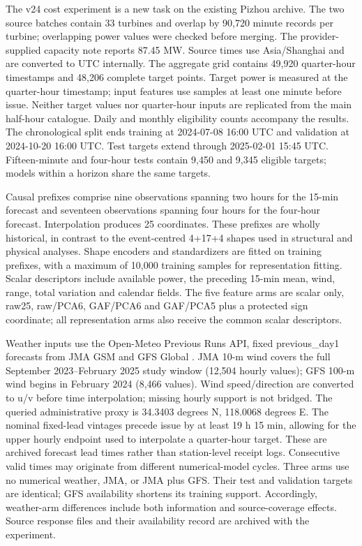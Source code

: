 \documentclass[a4paper,11pt]{article}
\begin{document}
The v24 cost experiment is a new task on the existing Pizhou archive. The two source batches contain 33 turbines and overlap by 90,720 minute records per turbine; overlapping power values were checked before merging. The provider-supplied capacity note reports 87.45 MW. Source times use Asia/Shanghai and are converted to UTC internally. The aggregate grid contains 49,920 quarter-hour timestamps and 48,206 complete target points. Target power is measured at the quarter-hour timestamp; input features use samples at least one minute before issue. Neither target values nor quarter-hour inputs are replicated from the main half-hour catalogue. Daily and monthly eligibility counts accompany the results. The chronological split ends training at 2024-07-08 16:00 UTC and validation at 2024-10-20 16:00 UTC. Test targets extend through 2025-02-01 15:45 UTC. Fifteen-minute and four-hour tests contain 9,450 and 9,345 eligible targets; models within a horizon share the same targets.

Causal prefixes comprise nine observations spanning two hours for the 15-min forecast and seventeen observations spanning four hours for the four-hour forecast. Interpolation produces 25 coordinates. These prefixes are wholly historical, in contrast to the event-centred 4+17+4 shapes used in structural and physical analyses. Shape encoders and standardizers are fitted on training prefixes, with a maximum of 10,000 training samples for representation fitting. Scalar descriptors include available power, the preceding 15-min mean, wind, range, total variation and calendar fields. The five feature arms are scalar only, raw25, raw/PCA6, GAF/PCA6 and GAF/PCA5 plus a protected sign coordinate; all representation arms also receive the common scalar descriptors.

Weather inputs use the Open-Meteo Previous Runs API, fixed previous\_day1 forecasts from JMA GSM and GFS Global \citep{openmeteo_previous}. JMA 10-m wind covers the full September 2023--February 2025 study window (12,504 hourly values); GFS 100-m wind begins in February 2024 (8,466 values). Wind speed/direction are converted to u/v before time interpolation; missing hourly support is not bridged. The queried administrative proxy is 34.3403 degrees N, 118.0068 degrees E. The nominal fixed-lead vintages precede issue by at least 19 h 15 min, allowing for the upper hourly endpoint used to interpolate a quarter-hour target. These are archived forecast lead times rather than station-level receipt logs. Consecutive valid times may originate from different numerical-model cycles. Three arms use no numerical weather, JMA, or JMA plus GFS. Their test and validation targets are identical; GFS availability shortens its training support. Accordingly, weather-arm differences include both information and source-coverage effects. Source response files and their availability record are archived with the experiment.
\end{document}
